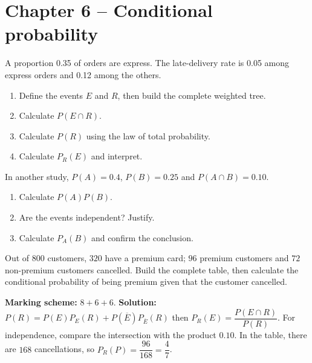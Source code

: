 \section*{Chapter 6 -- Conditional probability}
\begin{exercise}
A proportion \num{0,35} of orders are express. The late-delivery rate is \num{0,05} among express orders and \num{0,12} among the others.
\begin{enumerate}
\item Define the events $E$ and $R$, then build the complete weighted tree.
\item Calculate $P(E\cap R)$.
\item Calculate $P(R)$ using the law of total probability.
\item Calculate $P_R(E)$ and interpret.
\end{enumerate}
\end{exercise}
\begin{exercise}[2 -- Independence]
In another study, $P(A)=\num{0,4}$, $P(B)=\num{0,25}$ and $P(A\cap B)=\num{0,10}$.
\begin{enumerate}
\item Calculate $P(A)P(B)$.
\item Are the events independent? Justify.
\item Calculate $P_A(B)$ and confirm the conclusion.
\end{enumerate}
\end{exercise}
\begin{exercise}
Out of $800$ customers, $320$ have a premium card; $96$ premium customers and $72$ non-premium customers cancelled. Build the complete table, then calculate the conditional probability of being premium given that the customer cancelled.
\end{exercise}
\begin{solution}\textbf{Marking scheme:} $8+6+6$. \textbf{Solution:} $P(R)=P(E)P_E(R)+P(\overline E)P_{\overline E}(R)$ then $P_R(E)=\dfrac{P(E\cap R)}{P(R)}$. For independence, compare the intersection with the product $\num{0,10}$. In the table, there are $168$ cancellations, so $P_R(P)=\dfrac{96}{168}=\dfrac47$.\end{solution}


